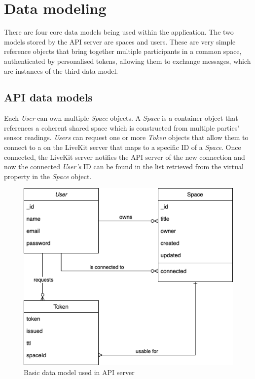 \section{Data modeling}

There are four core data models being used within the application. The two models stored by the \ac{API} server are spaces and users. These are very simple reference objects that bring together multiple participants in a common space, authenticated by personalised tokens, allowing them to exchange messages, which are instances of the third data model.

\subsection{API data models}

Each \emph{User} can own multiple \emph{Space} objects. A \emph{Space} is a container object that references a coherent shared space which is constructed from multiple parties' sensor readings. \emph{Users} can request one or more \emph{Token} objects that allow them to connect to a  on the LiveKit server that maps to a specific ID of a \emph{Space}. Once connected, the LiveKit server notifies the \ac{API} server of the new connection and now the connected \emph{User's} ID can be found in the list retrieved from the virtual  property in the \emph{Space} object.

\begin{figure}[h]
\centering
\includegraphics[scale=0.4]{04_Artefakte/01_Abbildungen/api-datamodel}
\caption[API data model]{Basic data model used in API server\protect}
\label{fig:apiDataModel}
\end{figure}

